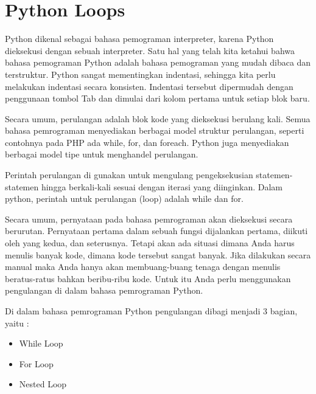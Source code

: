 \section{Python Loops}
Python dikenal sebagai bahasa pemograman interpreter, karena Python dieksekusi dengan sebuah interpreter. Satu hal yang telah kita ketahui bahwa bahasa pemograman Python adalah bahasa pemograman yang mudah dibaca dan terstruktur. Python sangat mementingkan indentasi, sehingga kita perlu melakukan indentasi secara konsisten. Indentasi tersebut dipermudah dengan penggunaan tombol Tab dan dimulai dari kolom pertama untuk setiap blok baru\cite{santoso2009bahasa}.

Secara umum, perulangan adalah blok kode yang dieksekusi berulang kali. Semua bahasa pemrograman menyediakan berbagai model struktur perulangan, seperti contohnya pada PHP ada while, for, dan foreach. Python juga menyediakan berbagai model tipe untuk menghandel perulangan. \par

Perintah perulangan di gunakan untuk mengulang pengeksekusian statemen-statemen hingga
berkali-kali sesuai dengan iterasi yang diinginkan. Dalam python, perintah untuk perulangan (loop)
adalah while dan for.

Secara umum, pernyataan pada bahasa pemrograman akan dieksekusi secara berurutan. Pernyataan pertama dalam sebuah fungsi dijalankan pertama, diikuti oleh yang kedua, dan seterusnya. Tetapi akan ada situasi dimana Anda harus menulis banyak kode, dimana kode tersebut sangat banyak. Jika dilakukan secara manual maka Anda hanya akan membuang-buang tenaga dengan menulis beratus-ratus bahkan beribu-ribu kode. Untuk itu Anda perlu menggunakan pengulangan di dalam bahasa pemrograman Python. \par

Di dalam bahasa pemrograman Python pengulangan dibagi menjadi 3 bagian, yaitu : 
\begin{itemize}
\item
While Loop 
\item
For Loop 
\item
Nested Loop 
\end{itemize} 
\vspace{\baselineskip}
\vspace{\baselineskip}
\vspace{12pt}

